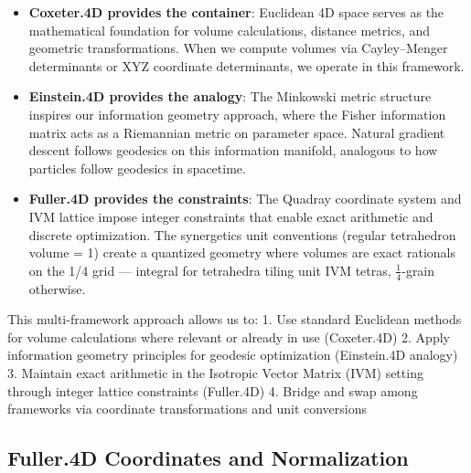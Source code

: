 \documentclass[
  10pt,
]{article}
\begin{document}
\begin{itemize}
\item
  \textbf{Coxeter.4D provides the container}: Euclidean 4D space serves
  as the mathematical foundation for volume calculations, distance
  metrics, and geometric transformations. When we compute volumes via
  Cayley--Menger determinants or XYZ coordinate determinants, we operate
  in this framework.
\item
  \textbf{Einstein.4D provides the analogy}: The Minkowski metric
  structure inspires our information geometry approach, where the Fisher
  information matrix acts as a Riemannian metric on parameter space.
  Natural gradient descent follows geodesics on this information
  manifold, analogous to how particles follow geodesics in spacetime.
\item
  \textbf{Fuller.4D provides the constraints}: The Quadray coordinate
  system and IVM lattice impose integer constraints that enable exact
  arithmetic and discrete optimization. The synergetics unit conventions
  (regular tetrahedron volume = 1) create a quantized geometry where
  volumes are exact rationals on the 1/4 grid --- integral for
  tetrahedra tiling unit IVM tetras, \(\tfrac14\)-grain otherwise.
\end{itemize}

This multi-framework approach allows us to: 1. Use standard Euclidean
methods for volume calculations where relevant or already in use
(Coxeter.4D) 2. Apply information geometry principles for geodesic
optimization (Einstein.4D analogy)\\
3. Maintain exact arithmetic in the Isotropic Vector Matrix (IVM)
setting through integer lattice constraints (Fuller.4D) 4. Bridge and
swap among frameworks via coordinate transformations and unit
conversions

\subsection{Fuller.4D Coordinates and
Normalization}\label{fuller.4d-coordinates-and-normalization}
\end{document}
